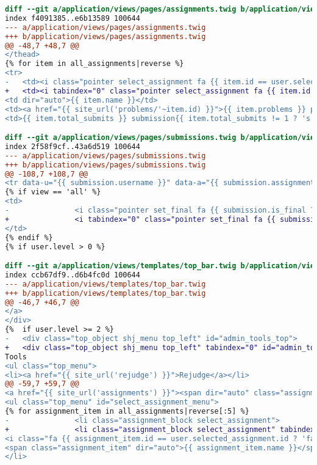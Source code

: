 \begin{itemize}
\begin{lstlisting}[language=diff, caption=Perubahan untuk mematuhi kriteria 2.1.1, label=lst_2.1.1, basicstyle=\ttfamily, frame=single,
columns=fullflexible, keepspaces=true, breaklines=true]
diff --git a/application/views/pages/assignments.twig b/application/views/pages/assignments.twig
index f4091385..e6b13589 100644
--- a/application/views/pages/assignments.twig
+++ b/application/views/pages/assignments.twig
@@ -48,7 +48,7 @@
</thead>
{% for item in all_assignments|reverse %}
<tr>
- 	<td><i class="pointer select_assignment fa {{ item.id == user.selected_assignment.id ? 'fa-check-square-o color6' : 'fa-square-o' }} fa-2x" data-id="{{ item.id }}"></i></td>
+ 	<td><i tabindex="0" class="pointer select_assignment fa {{ item.id == user.selected_assignment.id ? 'fa-check-square-o color6' : 'fa-square-o' }} fa-2x" data-id="{{ item.id }}"></i></td>
<td dir="auto">{{ item.name }}</td>
<td><a href="{{ site_url('problems/'~item.id) }}">{{ item.problems }} problem{{ item.problems != 1 ? 's' }}</a></td>
<td>{{ item.total_submits }} submission{{ item.total_submits != 1 ? 's' }}</td>

diff --git a/application/views/pages/submissions.twig b/application/views/pages/submissions.twig
index 2f58f9cf..43a6d519 100644
--- a/application/views/pages/submissions.twig
+++ b/application/views/pages/submissions.twig
@@ -108,7 +108,7 @@
<tr data-u="{{ submission.username }}" data-a="{{ submission.assignment }}" data-p="{{ submission.problem }}" data-s="{{ submission.submit_id }}" {% if view == 'final' and j is even %}class="hl"{% endif %}>
{% if view == 'all' %}
<td>
- 				<i class="pointer set_final fa {{ submission.is_final ? 'fa-check-circle-o color11' : 'fa-circle-o' }} fa-2x"></i>
+ 				<i tabindex="0" class="pointer set_final fa {{ submission.is_final ? 'fa-check-circle-o color11' : 'fa-circle-o' }} fa-2x"></i>
</td>
{% endif %}
{% if user.level > 0 %}

diff --git a/application/views/templates/top_bar.twig b/application/views/templates/top_bar.twig
index ccb67df9..d6b4fc0d 100644
--- a/application/views/templates/top_bar.twig
+++ b/application/views/templates/top_bar.twig
@@ -46,7 +46,7 @@
</a>
</div>
{%  if user.level >= 2 %}
- 	<div class="top_object shj_menu top_left" id="admin_tools_top">
+ 	<div class="top_object shj_menu top_left" tabindex="0" id="admin_tools_top">
Tools
<ul class="top_menu">
<li><a href="{{ site_url('rejudge') }}">Rejudge</a></li>
@@ -59,7 +59,7 @@
<a href="{{ site_url('assignments') }}"><span dir="auto" class="assignment_name">{{ user.selected_assignment.name|length > 30 ? user.selected_assignment.name|slice(0, 30) ~ '...' : user.selected_assignment.name }}</span></a>
<ul class="top_menu" id="select_assignment_menu">
{% for assignment_item in all_assignments|reverse[:5] %}
- 				<li class="assignment_block select_assignment">
+ 				<li class="assignment_block select_assignment" tabindex="0">
<i class="fa {{ assignment_item.id == user.selected_assignment.id ? 'fa-check-square-o color6' : 'fa-square-o' }}" data-id="{{ assignment_item.id }}"></i>
<span class="assignment_item" dir="auto">{{ assignment_item.name }}</span>
</li>


\end{lstlisting}
\end{itemize}

